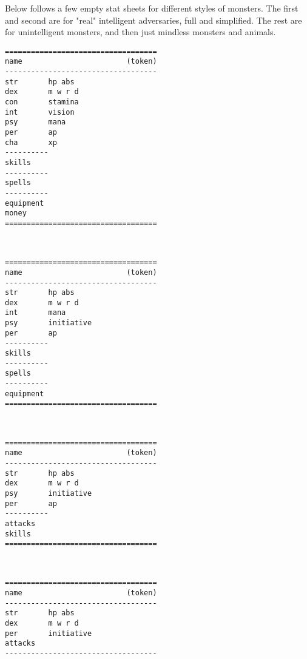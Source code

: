 Below follows a few empty stat sheets for different styles of monsters. The first and second are for "real" intelligent adversaries, full and simplified. The rest are for unintelligent monsters, and then just mindless monsters and animals.

\pagebreak[1]
\tiny \begin{samepage} \begin{verbatim}
===================================
name                        (token)
-----------------------------------
str       hp abs
dex       m w r d
con       stamina
int       vision
psy       mana
per       ap
cha       xp
----------
skills
----------
spells
----------
equipment
money
===================================
\end{verbatim} \end{samepage} \normalsize

\

\pagebreak[1]
\tiny \begin{samepage} \begin{verbatim}
===================================
name                        (token)
-----------------------------------
str       hp abs
dex       m w r d
int       mana
psy       initiative
per       ap
----------
skills
----------
spells
----------
equipment
===================================
\end{verbatim} \end{samepage} \normalsize

\

\pagebreak[1]
\tiny \begin{samepage} \begin{verbatim}
===================================
name                        (token)
-----------------------------------
str       hp abs
dex       m w r d
psy       initiative
per       ap
----------
attacks
skills
===================================
\end{verbatim} \end{samepage} \normalsize

\

\pagebreak[1]
\tiny \begin{samepage} \begin{verbatim}
===================================
name                        (token)
-----------------------------------
str       hp abs
dex       m w r d
per       initiative
attacks
-----------------------------------
\end{verbatim} \end{samepage} \normalsize

